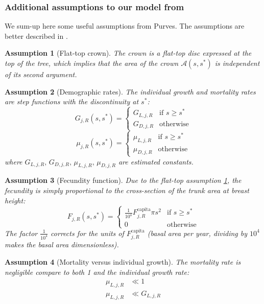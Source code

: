 \documentclass[letterpaper, 12pt]{article}
\newcommand {\s}{{s}^{*}}
\newcommand {\A}{\mathscr{A}}
\theoremstyle{theo}
\newtheorem{assum}{Assumption}[section]
\begin{document}
\begin{refsection}
\begin{onehalfspace}
\subsubsection{Additional assumptions to our model from \citet{Purves2009}}
We sum-up here some useful assumptions from Purves. The assumptions are better described in \citet[not to confound with 2009's paper]{Purves2008}.
\begin{assum}[Flat-top crown] \label{assum::flat-top}
	The crown is a flat-top disc expressed at the top of the tree, which implies that the area of the crown $ \A(s, \s) $ is independent of its second argument.
\end{assum}

\begin{assum}[Demographic rates]
	The individual growth and mortality rates are step functions with the discontinuity at $ \s $:
	\[
		G_{j, R}(s, \s) =
		\begin{cases}
			G_{L, j, R} & \text{if } s \geqslant \s \\
			G_{D, j, R} & \text{otherwise}
		\end{cases}
	\]
	\[
	\mu_{j, R}(s, \s) =
		\begin{cases}
			\mu_{L, j, R} & \text{if } s \geqslant \s \\
			\mu_{D, j, R} & \text{otherwise}
		\end{cases}
	\]
	where $ G_{L, j, R}, \, G_{D, j, R}, \, \mu_{L, j, R}, \, \mu_{D, j, R} $ are estimated constants.
\end{assum}

\begin{assum}[Fecundity function]
	Due to the flat-top assumption \ref{assum::flat-top}, the fecundity is simply proportional to the cross-section of the trunk area at breast height:
	\[
		F_{j, R} (s, \s) =
		\begin{cases}
			\frac{1}{10^4} F_{j, R}^{\text{capita}} \pi s^2 & \text{if } s \geqslant \s \\
			0 & \text{otherwise}
		\end{cases}
	\]
	The factor $ \frac{1}{10^4} $ corrects for the units of $ F_{j, R}^{\text{capita}} $ (basal area per year, dividing by $ 10^4 $ makes the basal area dimensionless).
\end{assum}

\begin{assum}[Mortality versus individual growth] \label{assum::negligible}
	The mortality rate is negligible compare to both 1 and the individual growth rate:
	\begin{align}
		\mu_{L, j, R} &\ll 1 \\
		\mu_{L, j, R} &\ll G_{L, j, R}
	\end{align}
\end{assum}


\end{onehalfspace}
\end{refsection}
\end{document}

